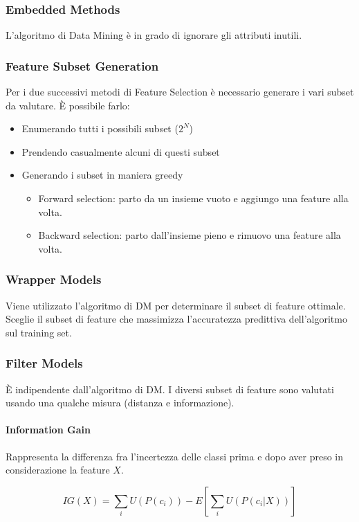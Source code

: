 \documentclass[11pt,onecolumn,a4paper,oneside]{book}
\begin{document}
\subsubsection{Embedded Methods}
L'algoritmo di Data Mining è in grado di ignorare gli attributi inutili.

\subsubsection{Feature Subset Generation}
Per i due successivi metodi di Feature Selection è necessario generare i vari subset da valutare.
È possibile farlo:
\begin{itemize}
\item Enumerando tutti i possibili subset ($2^N$)
\item Prendendo casualmente alcuni di questi subset
\item Generando i subset in maniera greedy
\begin{itemize}
\item Forward selection: parto da un insieme vuoto e aggiungo una feature alla volta.
\item Backward selection: parto dall'insieme pieno e rimuovo una feature alla volta.
\end{itemize}
\end{itemize}

				
\subsubsection{Wrapper Models}
Viene utilizzato l'algoritmo di DM per determinare il subset di feature ottimale. Sceglie il subset di feature che massimizza l'accuratezza predittiva dell'algoritmo sul training set.


\subsubsection{Filter Models}
È indipendente dall'algoritmo di DM.
I diversi subset di feature sono valutati usando una qualche misura (distanza e informazione).

\paragraph{Information Gain}
Rappresenta la differenza fra l'incertezza delle classi prima e dopo aver preso in considerazione la feature $X$.

$$IG(X) = \sum_i U \left(P(c_i) \right) - E \left[ \sum_i U \left( P(c_i | X ) \right) \right]$$
\end{document}
